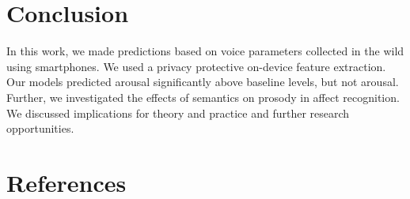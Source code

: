 \documentclass[
  english,
  man,floatsintext]{apa6}
\begin{document}
\hypertarget{conclusion}{%
\section{Conclusion}\label{conclusion}}

In this work, we made predictions based on voice parameters collected in the wild using smartphones. We used a privacy protective on-device feature extraction. Our models predicted arousal significantly above baseline levels, but not arousal. Further, we investigated the effects of semantics on prosody in affect recognition. We discussed implications for theory and practice and further research opportunities.

\newpage

\hypertarget{references}{%
\section{References}\label{references}}

\begingroup
\setlength{\parindent}{-0.5in}
\setlength{\leftskip}{0.5in}
\end{document}
